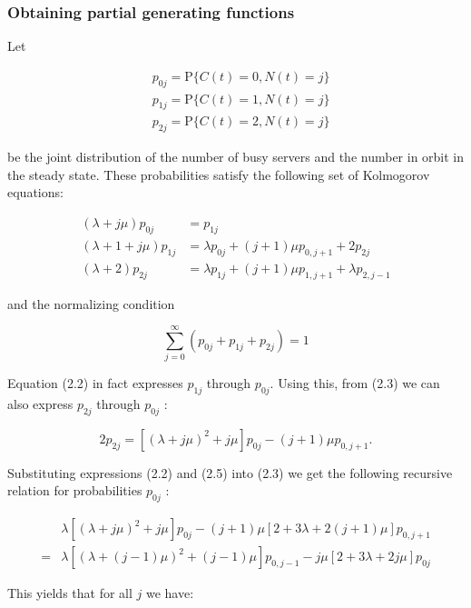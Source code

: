 \documentclass[10pt]{article}
\begin{document}
\subsubsection{Obtaining partial generating functions}
Let

$$
\begin{aligned}
& p_{0 j}=\mathrm{P}\{C(t)=0, N(t)=j\} \\
& p_{1 j}=\mathrm{P}\{C(t)=1, N(t)=j\} \\
& p_{2 j}=\mathrm{P}\{C(t)=2, N(t)=j\}
\end{aligned}
$$

be the joint distribution of the number of busy servers and the number in orbit in the steady state. These probabilities satisfy the following set of Kolmogorov equations:


\begin{align*}
(\lambda+j \mu) p_{0 j} & =p_{1 j} \\
(\lambda+1+j \mu) p_{1 j} & =\lambda p_{0 j}+(j+1) \mu p_{0, j+1}+2 p_{2 j}  \\
(\lambda+2) p_{2 j} & =\lambda p_{1 j}+(j+1) \mu p_{1, j+1}+\lambda p_{2, j-1} 
\end{align*}


and the normalizing condition


\begin{equation*}
\sum_{j=0}^{\infty}\left(p_{0 j}+p_{1 j}+p_{2 j}\right)=1 
\end{equation*}


Equation (2.2) in fact expresses $p_{1 j}$ through $p_{0 j}$. Using this, from (2.3) we can also express $p_{2 j}$ through $p_{0 j}$ :


\begin{equation*}
2 p_{2 j}=\left[(\lambda+j \mu)^{2}+j \mu\right] p_{0 j}-(j+1) \mu p_{0, j+1} . 
\end{equation*}


Substituting expressions (2.2) and (2.5) into (2.3) we get the following recursive relation for probabilities $p_{0 j}$ :

$$
\begin{aligned}
& \lambda\left[(\lambda+j \mu)^{2}+j \mu\right] p_{0 j}-(j+1) \mu[2+3 \lambda+2(j+1) \mu] p_{0, j+1} \\
= & \lambda\left[(\lambda+(j-1) \mu)^{2}+(j-1) \mu\right] p_{0, j-1}-j \mu[2+3 \lambda+2 j \mu] p_{0 j}
\end{aligned}
$$

This yields that for all $j$ we have:
\end{document}
